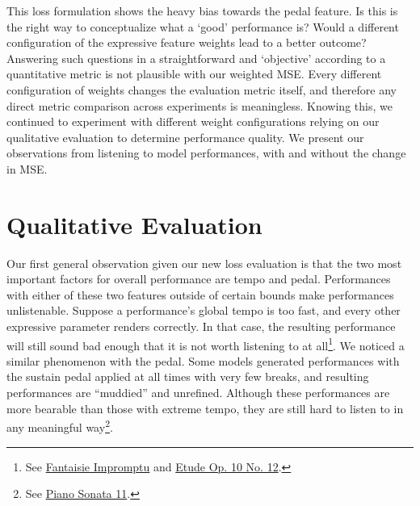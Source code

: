 This loss formulation shows the heavy bias towards the pedal feature. Is this is the right way to conceptualize what a `good' performance is? Would a different configuration of the expressive feature weights lead to a better outcome? Answering such questions in a straightforward and `objective' according to a quantitative metric is not plausible with our weighted MSE. Every different configuration of weights changes the evaluation metric itself, and therefore any direct metric comparison across experiments is meaningless. Knowing this, we continued to experiment with different weight configurations relying on our qualitative evaluation to determine performance quality. We present our observations from listening to model performances, with and without the change in MSE. 



\section{Qualitative Evaluation}\label{sec:qualitative-analysis}
Our first general observation given our new loss evaluation is that the two most important factors for overall performance are tempo and pedal. Performances with either of these two features outside of certain bounds make performances unlistenable. Suppose a performance's global tempo is too fast, and every other expressive parameter renders correctly. In that case, the resulting performance will still sound bad enough that it is not worth listening to at all\footnote%
{See \href{https://ui.neptune.ai/richt3211/thesis/e/THESIS-86/artifacts}{ Fantaisie Impromptu} and \href{https://ui.neptune.ai/richt3211/thesis/e/THESIS-126/artifacts}{ Etude Op. 10 No. 12}.}. We noticed a similar phenomenon with the pedal. Some models generated performances with the sustain pedal applied at all times with very few breaks, and resulting performances are ``muddied'' and unrefined. Although these performances are more bearable than those with extreme tempo, they are still hard to listen to in any meaningful way\footnote{See \href{https://ui.neptune.ai/richt3211/thesis/e/THESIS-125/artifacts}{ Piano Sonata 11}.}. 

